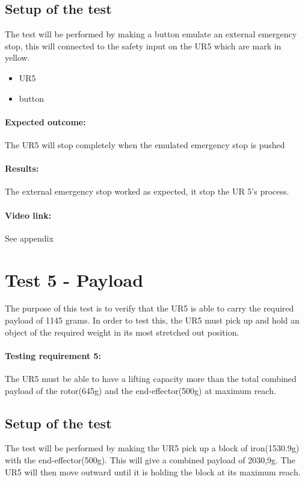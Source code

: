\subsection{Setup of the test}
The test will be performed by making a button emulate an external emergency stop, this will connected to the safety input on the UR5 which are mark in yellow.

 \begin{itemize}
     \item UR5
     \item button
 \end{itemize}
 
 \paragraph{Expected outcome:}
The UR5 will stop completely when the emulated emergency stop is pushed

 
\paragraph{Results: }

The external emergency stop worked as expected, it stop the UR 5's process.

\paragraph{Video link: }
See appendix \cite{testfilm}


\section{Test 5 - Payload}
The purpose of this test is to verify that the UR5 is able to carry the required payload of 1145 grams. In order to test this, the UR5 must pick up and hold an object of the required weight in its most stretched out position.

\paragraph{Testing requirement 5:} The UR5 must be able to have a lifting capacity more than the total combined payload of the rotor(645g) and the end-effector(500g) at maximum reach.\\

\subsection{Setup of the test}
The test will be performed by making the UR5 pick up a block of iron(1530.9g) with the end-effector(500g). This will give a combined payload of 2030,9g. The UR5 will then move outward until it is holding the block at its maximum reach. 

